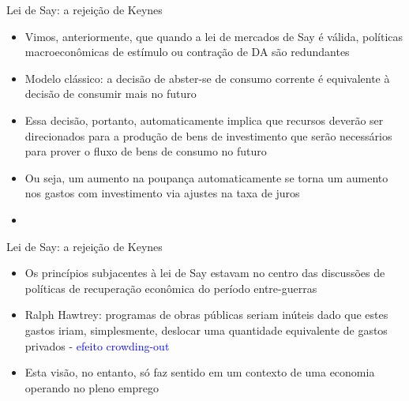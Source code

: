 \documentclass[10pt]{beamer}
\begin{document}
\begin{frame}{Lei de Say: a rejeição de Keynes}
    \begin{itemize}
        \item Vimos, anteriormente, que quando a lei de mercados de Say é válida, políticas macroeconômicas de estímulo ou contração de DA são redundantes
        \bigskip
        \item Modelo clássico: a decisão de abster-se de consumo corrente é equivalente à decisão de consumir mais no futuro
        \bigskip
        \item Essa decisão, portanto, automaticamente implica que recursos deverão ser direcionados para a produção de bens de investimento que serão necessários para prover o fluxo de bens de consumo no futuro
        \bigskip
        \item Ou seja, um aumento na poupança automaticamente se torna um aumento nos gastos com investimento via ajustes na taxa de juros
        \bigskip
        \item {}
    \end{itemize}    
\end{frame}

\begin{frame}{Lei de Say: a rejeição de Keynes}
    \begin{itemize}
        \item Os princípios subjacentes à lei de Say estavam no centro das discussões de políticas  de recuperação econômica do período entre-guerras
        \bigskip
        \item Ralph Hawtrey: programas de obras públicas seriam inúteis dado que estes gastos iriam, simplesmente, deslocar uma quantidade equivalente de gastos privados - \textcolor{blue}{efeito crowding-out}
        \bigskip
        \item Esta visão, no entanto, só faz sentido em um contexto de uma economia operando no pleno emprego
    \end{itemize}
\end{frame}
\end{document}
